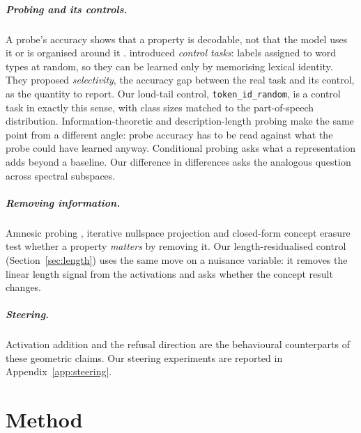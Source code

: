 \documentclass[11pt]{report}
\begin{document}
\paragraph{Probing and its controls.}
A probe's accuracy shows that a property is decodable, not that the model uses
it or is organised around it \citep{belinkov2022probing,ravichander2021probing}.
\citet{hewitt2019designing} introduced \emph{control tasks}: labels assigned to
word types at random, so they can be learned only by memorising lexical
identity. They proposed \emph{selectivity}, the accuracy gap between the real
task and its control, as the quantity to report. Our loud-tail control,
\texttt{token\_id\_random}, is a control task in exactly this sense, with class
sizes matched to the part-of-speech distribution. Information-theoretic
\citep{pimentel2020information} and description-length
\citep{voita2020information} probing make the same point from a different angle:
probe accuracy has to be read against what the probe could have learned anyway.
Conditional probing \citep{hewitt2021conditional} asks what a representation
adds beyond a baseline. Our difference in differences asks the analogous
question across spectral subspaces.

\paragraph{Removing information.}
Amnesic probing \citep{elazar2021amnesic}, iterative nullspace projection
\citep{ravfogel2020null} and closed-form concept erasure
\citep{belrose2023leace} test whether a property \emph{matters} by removing
it. Our length-residualised control (Section~\ref{sec:length}) uses the same
move on a nuisance variable: it removes the linear length signal from the
activations and asks whether the concept result changes.

\paragraph{Steering.}
Activation addition \citep{turner2023activation,panickssery2024steering} and the
refusal direction \citep{arditi2024refusal} are the behavioural counterparts of
these geometric claims. Our steering experiments are reported in
Appendix~\ref{app:steering}.

\chapter{Method}\label{ch:method}
\end{document}
